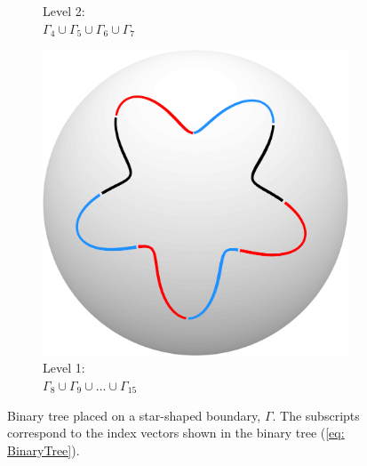 \documentclass{sfuthesis}
\begin{document}
\begin{figure}
\begin{subfigure}[b]{0.23\textwidth}
                \caption{Level 2: \\ $\Gamma_4 \cup \Gamma_5 \cup \Gamma_6 \cup \Gamma_7$}
                \label{fig: ContourLevel2}
        \end{subfigure}
          \begin{subfigure}[b]{0.23\textwidth}
             \captionsetup{justification=centering}
                \includegraphics[width=\textwidth]{ContourLevel1}
                 \caption{Level 1: \\ $\Gamma_8 \cup \Gamma_9 \cup ... \cup \Gamma_{15} $}
                \label{fig: ContourLevel1}
        \end{subfigure}
        \caption{Binary tree placed on a star-shaped boundary, $\Gamma$. The subscripts correspond to the index vectors shown in the binary tree (\ref{eq: BinaryTree}). }
        \label{fig: ContourBinaryTree}
\end{figure}

\end{document}
